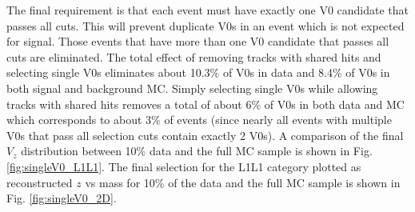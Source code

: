 The final requirement is that each event must have exactly one V0 candidate that passes all cuts. This will prevent duplicate V0s in an event which is not expected for signal. Those events that have more than one V0 candidate that passes all cuts are eliminated. The total effect of removing tracks with shared hits and selecting single V0s eliminates about 10.3\% of V0s in data and 8.4\% of V0s in both signal and background MC. Simply selecting single V0s while allowing tracks with shared hits removes a total of about 6\% of V0s in both data and MC which corresponds to about 3\% of events (since nearly all events with multiple V0s that pass all selection cuts contain exactly 2 V0s). A comparison of the final $V_z$ distribution between 10\% data and the full MC sample is shown in Fig. \ref{fig:singleV0_L1L1}. The final selection for the L1L1 category plotted as reconstructed $z$ vs mass for 10\% of the data and the full MC sample is shown in Fig. \ref{fig:singleV0_2D}.


